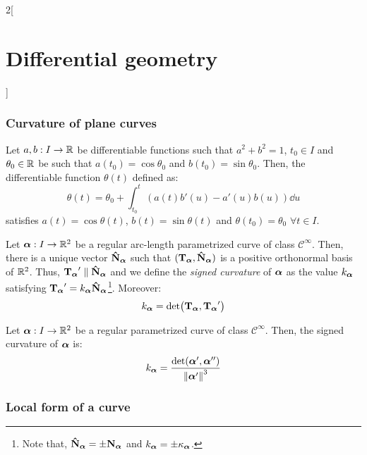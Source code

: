 \documentclass[../../../main.tex]{subfiles}
\begin{document}
\begin{multicols}{2}[\section{Differential geometry}]
  \subsubsection{Curvature of plane curves}
  \begin{lemma}
    Let $a,b:I\rightarrow\mathbb{R}$ be differentiable functions such that $a^2+b^2=1$, $t_0\in I$ and $\theta_0\in\mathbb{R}$ be such that $a(t_0)=\cos\theta_0$ and $b(t_0)=\sin\theta_0$. Then, the differentiable function $\theta(t)$ defined as:
    $$\theta(t)=\theta_0+\int_{t_0}^t\left(a(t)b'(u)-a'(u)b(u)\right)\dd{u}$$
    satisfies $a(t)=\cos\theta(t)$, $b(t)=\sin\theta(t)$ and $\theta(t_0)=\theta_0$ $\forall t\in I$.
  \end{lemma}
  \begin{proposition}
    Let $\boldsymbol{\mathrm{\alpha}}:I\rightarrow\mathbb{R}^2$ be a regular arc-length parametrized curve of class $\mathcal{C}^\infty$. Then, there is a unique vector $\boldsymbol{\mathrm{\hat{N}}}_{\boldsymbol{\mathrm{\alpha}}}$ such that $({\boldsymbol{\mathrm{T}}_{\boldsymbol{\mathrm{\alpha}}}},\boldsymbol{\mathrm{\hat{N}}}_{\boldsymbol{\mathrm{\alpha}}})$ is a positive orthonormal basis of $\mathbb{R}^2$. Thus, ${\boldsymbol{\mathrm{T}}_{\boldsymbol{\mathrm{\alpha}}}}'\parallel \boldsymbol{\mathrm{\hat{N}}}_{\boldsymbol{\mathrm{\alpha}}}$ and we define the \emph{signed curvature} of $\boldsymbol{\mathrm{\alpha}}$ as the value $k_{\boldsymbol{\mathrm{\alpha}}}$ satisfying ${\boldsymbol{\mathrm{T}}_{\boldsymbol{\mathrm{\alpha}}}}'=k_{\boldsymbol{\mathrm{\alpha}}}\boldsymbol{\mathrm{\hat{N}}}_{\boldsymbol{\mathrm{\alpha}}}$\footnote{Note that, $\boldsymbol{\mathrm{\hat{N}}}_{\boldsymbol{\mathrm{\alpha}}}=\pm{\boldsymbol{\mathrm{N}}_{\boldsymbol{\mathrm{\alpha}}}}$ and $k_{\boldsymbol{\mathrm{\alpha}}}=\pm{\kappa_{\boldsymbol{\mathrm{\alpha}}}}$.}. Moreover: $$k_{\boldsymbol{\mathrm{\alpha}}}=\det({\boldsymbol{\mathrm{T}}_{\boldsymbol{\mathrm{\alpha}}}},{\boldsymbol{\mathrm{T}}_{\boldsymbol{\mathrm{\alpha}}}}')$$
  \end{proposition}
  \begin{proposition}
    Let $\boldsymbol{\mathrm{\alpha}}:I\rightarrow\mathbb{R}^2$ be a regular parametrized curve of class $\mathcal{C}^\infty$. Then, the signed curvature of $\boldsymbol{\mathrm{\alpha}}$ is: $$k_{\boldsymbol{\mathrm{\alpha}}}=\frac{\det(\boldsymbol{\mathrm{\alpha}}',\boldsymbol{\mathrm{\alpha}}'')}{{\|\boldsymbol{\mathrm{\alpha}}'\|}^3}$$
  \end{proposition}
  \subsubsection{Local form of a curve}
\end{multicols}
\end{document}
